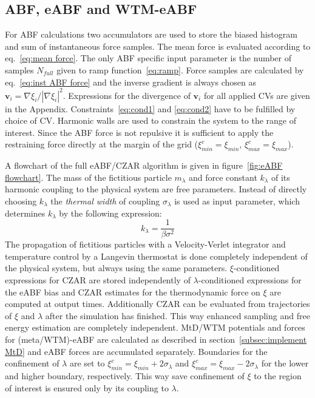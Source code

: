 \subsection{ABF, eABF and WTM-eABF}
For ABF calculations two accumulators are used to store the biased histogram and sum of instantaneous force samples. The mean force is evaluated according to eq.~\ref{eq:mean force}.
The only ABF specific input parameter is the number of samples $N_{full}$ given to ramp function~\ref{eq:ramp}.
Force samples are calculated by eq.~\ref{eq:inst ABF force} and the inverse gradient is always chosen as $\textbf{v}_i = \nabla \xi_i/|\nabla \xi_i|^2$. Expressions for the divergence of $\textbf{v}_i$ for all applied CVs are given in the Appendix.
Constraints~\ref{eq:cond1} and \ref{eq:cond2} have to be fulfilled by choice of CV.
Harmonic walls are used to constrain the system to the range of interest.
Since the ABF force is not repulsive it is sufficient to apply the restraining force directly at the margin of the grid ($\xi^c_{min}=\xi_{min}$, $\xi^c_{max}=\xi_{max}$).

A flowchart of the full eABF/CZAR algorithm is given in figure~\ref{fig:eABF flowchart}.
The mass of the fictitious particle $m_\lambda$ and force constant $k_\lambda$ of its harmonic coupling to the physical system are free parameters.
Instead of directly choosing $k_\lambda$ the \textit{thermal width} of coupling $\sigma_\lambda$ is used as input parameter, which determines $k_\lambda$ by the following expression:
\begin{equation}
  k_\lambda = \frac{1}{\beta \sigma^2}
\end{equation}
The propagation of fictitious particles with a Velocity-Verlet\autocite{swope1982computer} integrator and temperature control by a Langevin thermostat\autocite{kroger2005models} is done completely independent of the physical system, but always using the same parameters.
$\xi$-conditioned expressions for CZAR are stored independently of $\lambda$-conditioned expressions for the eABF bias and CZAR estimates for the thermodynamic force on $\xi$ are computed at output times.
Additionally CZAR can be evaluated from trajectories of $\xi$ and $\lambda$ after the simulation has finished.
This way enhanced sampling and free energy estimation are completely independent.
MtD/WTM potentials and forces for (meta/WTM)-eABF are calculated as described in section~\ref{subsec:implement MtD} and eABF forces are accumulated separately.
Boundaries for the confinement of $\lambda$ are set to $\xi^c_{min}=\xi_{min}+2\sigma_\lambda$ and $\xi^c_{max}=\xi_{max}-2\sigma_\lambda$ for the lower and higher boundary, respectively. This way save confinement of $\xi$ to the region of interest is ensured only by its coupling to $\lambda$.

